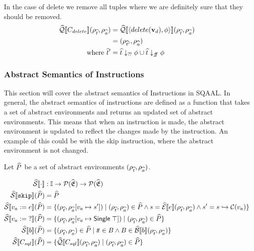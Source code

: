 In the case of delete we remove all tuples where we are definitely sure that they should be removed.
\begin{align*}
    \widehat{\mathcal{Q}}\llbracket C_{delete} \rrbracket(\rho_{\widehat{t}}, \rho_{\widehat{a}})
    &= \widehat{\mathcal{Q}}\llbracket \langle delete(\mathbf{v}_d), \phi \rangle \rrbracket (\rho_{\widehat{t}}, \rho_{\widehat{a}}) \\
    &= (\rho_{\widehat{t}'}, \rho_{\widehat{a}}) \\
    \text{where } \widehat{t}' &= \widehat{t} \downarrow_{?\!?} \phi \cup \widehat{t} \downarrow_{f\!\!f} \phi
\end{align*}

\subsubsection{Abstract Semantics of Instructions}
This section will cover the abstract semantics of Instructions in SQAAL.
In general, the abstract semantics of instructions are defined as a function that takes a set of abstract environments and returns an updated set of abstract environments.
This means that when an instruction is made, the abstract environment is updated to reflect the changes made by the instruction.
An example of this could be with the skip instruction, where the abstract environment is not changed.


Let $\widehat{P}$ be a set of abstract environments $(\rho_{\widehat{t}}, \rho_{\widehat{a}})$.

\begin{align}
    \widehat{\mathcal{S}} \llbracket \cdot \rrbracket &: \mathbb{I} \rightarrow \mathcal{P}(\widehat{\mathfrak{E}}) \rightarrow \mathcal{P}(\widehat{\mathfrak{E}}) \\
    \widehat{\mathcal{S}} \llbracket \texttt{skip} \rrbracket(\widehat{P}) &= \widehat{P} \\
    \widehat{\mathcal{S}} \llbracket v_a := e \rrbracket(\widehat{P}) &= \{(\rho_{\widehat{t}}, \rho_{\widehat{a}}[v_a \mapsto s']) \mid (\rho_{\widehat{t}}, \rho_{\widehat{a}}) \in \widehat{P} \land s = \widehat{\mathcal{E}}\llbracket e \rrbracket(\rho_{\widehat{t}}, \rho_{\widehat{a}}) \land s' = s \hookrightarrow \mathcal{C}(v_a) \} \\
    \widehat{\mathcal{S}} \llbracket v_a := \; ? \rrbracket(\widehat{P}) &= \{(\rho_{\widehat{t}}, \rho_{\widehat{a}}[v_a \mapsto \mathsf{Single} \; \top]) \mid (\rho_{\widehat{t}}, \rho_{\widehat{a}}) \in \widehat{P} \} \\
    \widehat{\mathcal{S}} \llbracket b \rrbracket(\widehat{P}) &= \{ (\rho_{\widehat{t}}, \rho_{\widehat{a}}) \in \widehat{P} \mid t\!t \in B \land B \in \widehat{\mathcal{B}}\llbracket b \rrbracket(\rho_{\widehat{t}}, \rho_{\widehat{a}}) \} \\
    \widehat{\mathcal{S}} \llbracket C_{sql} \rrbracket(\widehat{P}) &= \{\widehat{\mathcal{Q}}\llbracket C_{sql} \rrbracket(\rho_{\widehat{t}}, \rho_{\widehat{a}}) \mid (\rho_{\widehat{t}}, \rho_{\widehat{a}}) \in \widehat{P} \}
\end{align}

